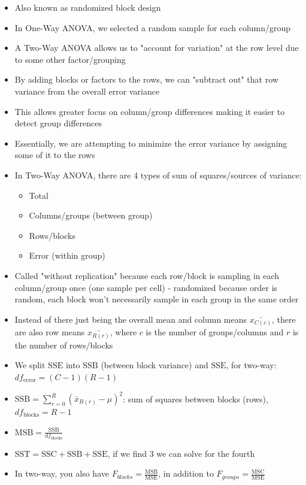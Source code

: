 \documentclass{article}
\begin{document}
\begin{itemize}
    \item Also known as randomized block design
    \item In One-Way ANOVA, we selected a random sample for each column/group
    \item A Two-Way ANOVA allows us to "account for variation" at the row level due to some other factor/grouping
    \item By adding blocks or factors to the rows, we can "subtract out" that row variance from the overall error variance
    \item This allows greater focus on column/group differences making it easier to detect group differences
    \item Essentially, we are attempting to minimize the error variance by assigning some of it to the rows
    \item In Two-Way ANOVA, there are 4 types of sum of squares/sources of variance: 
    \begin{itemize}
        \item Total
        \item Columns/groups (between group)
        \item Rows/blocks
        \item Error (within group)
    \end{itemize}
    \item Called "without replication" because each row/block is sampling in each column/group once (one sample per cell) - randomized because order is random, each block won't necessarily sample in each group in the same order
    \item Instead of there just being the overall mean and column means $\bar{x_{C(c)}}$, there are also row means $\bar{x_{R(r)}}$, where $c$ is the number of groups/columns and $r$ is the number of rows/blocks
    \item We split $\text{SSE}$ into $\text{SSB}$ (between block variance) and $\text{SSE}$, for two-way: $df_{\text{error}}=(C-1)(R-1)$
    \item $\text{SSB}=\sum_{r=0}^{R}(\bar{x}_{R(r)}-\mu)^2$: sum of squares between blocks (rows), $df_{\text{blocks}}=R-1$
    \item $\text{MSB}=\frac{\text{SSB}}{df_{\text{blocks}}}$
    \item $\text{SST}=\text{SSC}+\text{SSB}+\text{SSE}$, if we find 3 we can solve for the fourth
    \item In two-way, you also have $F_{blocks}=\frac{\text{MSB}}{\text{MSE}}$, in addition to $F_{groups}=\frac{\text{MSC}}{\text{MSE}}$
\end{itemize}
\end{document}

